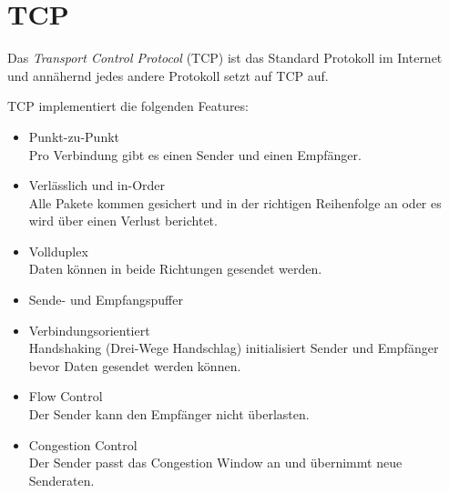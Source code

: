 	\section{TCP}
		Das \textit{Transport Control Protocol} (TCP) ist das Standard Protokoll im Internet und annähernd jedes andere Protokoll setzt auf TCP auf.

		TCP implementiert die folgenden Features:
		\begin{itemize}
			\item Punkt-zu-Punkt \\ Pro Verbindung gibt es einen Sender und einen Empfänger.
			\item Verlässlich und in-Order \\ Alle Pakete kommen gesichert und in der richtigen Reihenfolge an oder es wird über einen Verlust berichtet.
			\item Vollduplex \\ Daten können in beide Richtungen gesendet werden.
			\item Sende- und Empfangspuffer
			\item Verbindungsorientiert \\ Handshaking (Drei-Wege Handschlag) initialisiert Sender und Empfänger bevor Daten gesendet werden können.
			\item Flow Control \\ Der Sender kann den Empfänger nicht überlasten.
			\item Congestion Control \\ Der Sender passt das Congestion Window an und übernimmt neue Senderaten.
		\end{itemize}

